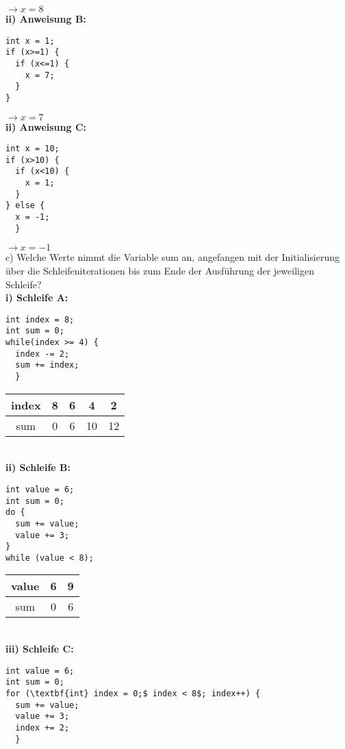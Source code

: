 \documentclass[paper=a4, fontsize=11pt]{scrartcl}
\numberwithin{equation}{section}
\numberwithin{figure}{section}
\numberwithin{table}{section}
\begin{document}
$\rightarrow x=8$ \\

\textbf{ii) Anweisung B:} \\
\begin{lstlisting}
int x = 1;
if (x>=1) {
  if (x<=1) {
    x = 7;
  }
}    
\end{lstlisting}

$\rightarrow x=7$ \\

\textbf{ii) Anweisung C:} \\
\begin{lstlisting}
int x = 10;
if (x>10) {
  if (x<10) {
    x = 1;
  }
} else {    
  x = -1;
  }
\end{lstlisting}

$\rightarrow x=-1$ \\

c) Welche Werte nimmt die Variable sum an, angefangen mit der Initialisierung über die Schleifeniterationen bis zum Ende der Ausführung der jeweiligen Schleife? \\

\textbf{i) Schleife A:} \\
\begin{lstlisting}
int index = 8;
int sum = 0; 
while(index >= 4) {
  index -= 2; 
  sum += index; 
  }
\end{lstlisting}

  \begin{tabular}{|c|c|c|c|c|}
  \hline
index & 8 & 6 & 4 & 2 \\
  \hline
sum & 0 & 6 & 10 & 12 \\
  \hline
  \end{tabular}
  \\

\textbf{ii) Schleife B:} \\
\begin{lstlisting}
int value = 6;
int sum = 0; 
do {
  sum += value; 
  value += 3; 
} 
while (value < 8);
\end{lstlisting}

  \begin{tabular}{|c|c|c|}
  \hline
value & 6 & 9  \\
  \hline
sum & 0 & 6  \\
  \hline
  \end{tabular}
\\

\textbf{iii) Schleife C:} \\
\begin{lstlisting}
int value = 6;
int sum = 0; 
for (\textbf{int} index = 0;$ index < 8$; index++) {
  sum += value; 
  value += 3;
  index += 2;
  }
\end{lstlisting}
\end{document}
